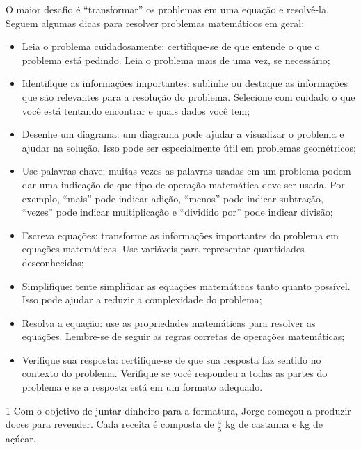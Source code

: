 {{{\begin{itemize}
\end{itemize}

O maior desafio é ``transformar'' os problemas em uma equação e
resolvê-la. Seguem algumas dicas para resolver problemas
matemáticos em geral:

\begin{itemize}
  \item Leia o problema cuidadosamente: certifique-se de que entende o que
o problema está pedindo. Leia o problema mais de uma vez, se necessário;

  \item Identifique as informações importantes: sublinhe ou destaque as
informações que são relevantes para a resolução do problema. Selecione com
cuidado o que você está tentando encontrar e quais dados você tem;

  \item Desenhe um diagrama: um diagrama pode ajudar a visualizar o
problema e ajudar na solução. Isso pode ser especialmente útil em
problemas geométricos;

  \item Use palavras-chave: muitas vezes as palavras usadas em um
problema podem dar uma indicação de que tipo de operação matemática deve
ser usada. Por exemplo, ``mais'' pode indicar adição, ``menos'' pode
indicar subtração, ``vezes'' pode indicar multiplicação e
``dividido por'' pode indicar divisão;

  \item Escreva equações: transforme as informações importantes do
problema em equações matemáticas. Use variáveis para representar
quantidades desconhecidas;

  \item Simplifique: tente simplificar as equações matemáticas tanto
quanto possível. Isso pode ajudar a reduzir a complexidade do problema;

  \item Resolva a equação: use as propriedades matemáticas para resolver
as equações. Lembre-se de seguir as regras corretas de operações
matemáticas;

  \item Verifique sua resposta: certifique-se de que sua resposta faz
sentido no contexto do problema. Verifique se você respondeu a todas as
partes do problema e se a resposta está em um formato adequado.
\end{itemize}
}


\num{1} Com o objetivo de juntar dinheiro para a formatura, Jorge começou a
produzir doces para revender. Cada receita é composta de $\frac{4}{5}$ kg de 
castanha e  kg de açúcar.

}}
